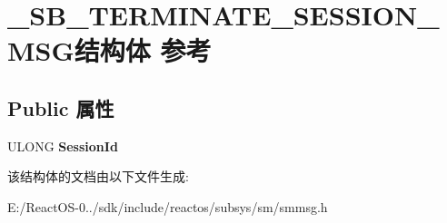 \hypertarget{struct___s_b___t_e_r_m_i_n_a_t_e___s_e_s_s_i_o_n___m_s_g}{}\section{\+\_\+\+S\+B\+\_\+\+T\+E\+R\+M\+I\+N\+A\+T\+E\+\_\+\+S\+E\+S\+S\+I\+O\+N\+\_\+\+M\+S\+G结构体 参考}
\label{struct___s_b___t_e_r_m_i_n_a_t_e___s_e_s_s_i_o_n___m_s_g}
\subsection*{Public 属性}
\begin{DoxyCompactItemize}
\item 
\mbox{\label{struct___s_b___t_e_r_m_i_n_a_t_e___s_e_s_s_i_o_n___m_s_g_a5534b41995ef8f6db467b0f22f29131a}} 
U\+L\+O\+NG {\bfseries Session\+Id}
\end{DoxyCompactItemize}


该结构体的文档由以下文件生成\+:\begin{DoxyCompactItemize}
\item 
E\+:/\+React\+O\+S-\/0../sdk/include/reactos/subsys/sm/smmsg.\+h\end{DoxyCompactItemize}
